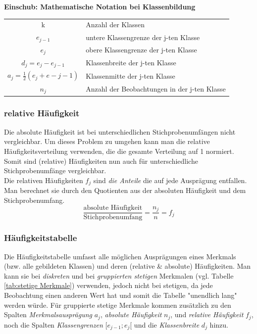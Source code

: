 \documentclass[a4paper]{article}
\begin{document}
\clearpage

\noindent \textbf{Einschub: Mathematische Notation bei Klassenbildung}\\
\begin{center}
    \begin{tabular}{cl}
         k & Anzahl der Klassen\\
$e_{j-1}$&untere Klassengrenze der j-ten Klasse\\
$e_j$&obere Klassengrenze der j-ten Klasse\\
$d_j=e_j-e_{j-1}$& Klassenbreite der j-ten Klasse\\
$a_j=\frac{1}{2}(e_j+e-{j-1})$& Klassenmitte der j-ten Klasse\\
$n_j$ &Anzahl der Beobachtungen in der j-ten Klasse\\
    \end{tabular}
\end{center}

\subsubsection{relative Häufigkeit}
Die absolute Häufigkeit ist bei unterschiedlichen Stichprobenumfängen nicht vergleichbar.
Um dieses Problem zu umgehen kann man die relative Häufigkeitsverteilung verwenden, die die gesamte Verteilung auf 1 normiert. Somit sind (relative) Häufigkeiten nun auch für unterschiedliche Stichprobenumfänge vergleichbar.\\
Die relativen Häufigkeiten $f_j$ sind \textit{die Anteile} die auf jede Ausprägung entfallen. Man berechnet sie durch den Quotienten aus der absoluten Häufigkeit und dem Stichprobenumfang.
$$\frac {\mbox {absolute Häufigkeit}}{\mbox{Stichprobenumfang}} = \frac{n_j}{n}=f_j$$

\subsubsection{Häufigkeitstabelle}
Die Häufigkeitstabelle umfasst alle möglichen Ausprägungen eines Merkmals (bzw. alle gebildeten Klassen) und deren (relative \& absolute) Häufigkeiten.
Man kann sie bei \textit{diskreten} und bei \textit{gruppierten stetigen} Merkmalen (vgl. Tabelle \ref{tab:stetige Merkmale}) verwenden, jedoch nicht bei stetigen, da jede Beobachtung einen anderen Wert hat und somit die Tabelle "unendlich lang" werden würde. Für gruppierte stetige Merkmale kommen zusätzlich zu den Spalten \textit{Merkmalsausprägung} $a_j$, \textit{absolute Häufigkeit} $n_j$, und \textit{relative Häufigkeit} $f_j$, noch die Spalten \textit{Klassengrenzen} [$e_{j-1};e_j$[ und die \textit{Klassenbreite} $d_j$ hinzu.
\end{document}
